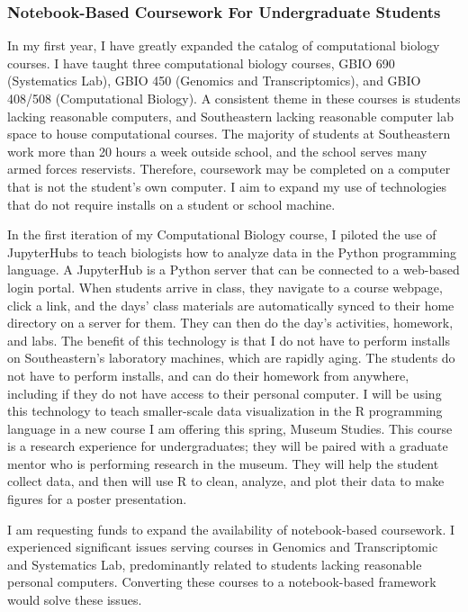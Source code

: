 \documentclass[]{article}
\begin{document}
	\subsubsection*{Notebook-Based Coursework For Undergraduate Students}
In my first year, I have greatly expanded the catalog of computational biology courses.
I have taught three computational biology courses, GBIO 690 (Systematics Lab), GBIO 450 (Genomics and Transcriptomics), and GBIO 408/508 (Computational Biology). 
A consistent theme in these courses is students lacking reasonable computers, and Southeastern lacking reasonable computer lab space to house computational courses. 
The majority of students at Southeastern work more than 20 hours a week outside school, and the school serves many armed forces reservists.
Therefore, coursework may be completed on a computer that is not the student's own computer.
I aim to expand my use of technologies that do not require installs on a student or school machine.
\par
In the first iteration of my Computational Biology course, I piloted
the use of JupyterHubs to teach biologists how to analyze data in the Python programming language.
A JupyterHub is a Python server that can be connected to a web-based login portal.
When students arrive in class, they navigate to a course webpage, click a link, and the days' class materials are automatically synced to their home directory on a server for them.
They can then do the day's activities, homework, and labs.
The benefit of this technology is that I do not have to perform installs on Southeastern's laboratory machines, which are rapidly aging.
The students do not have to perform installs, and can do their homework from anywhere, including if they do not have access to their personal computer.
I will be using this technology to teach smaller-scale data visualization in the R programming language in a new course I am offering this spring, Museum Studies. 
This course is a research experience for undergraduates; they will be paired with a graduate mentor who is performing research in the museum.
They will help the student collect data, and then will use R to clean, analyze, and plot their data to make figures for a poster presentation. \par
I am requesting funds to expand the availability of notebook-based coursework.
I experienced significant issues serving courses in Genomics and Transcriptomic and Systematics Lab, predominantly related to students lacking reasonable personal computers.
Converting these courses to a notebook-based framework would solve these issues.
\end{document}
